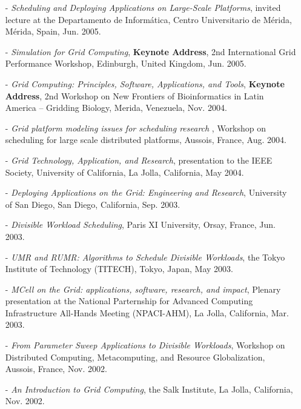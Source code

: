 \documentclass[times,11pt]{letter}
\begin{document}
\begin{itemize}
\item [-] {\it Scheduling and Deploying Applications on Large-Scale
Platforms}, invited lecture at the Departamento de Inform\'atica, Centro
Universitario de M\'erida, M\'erida, Spain, Jun. 2005.

\item [-] {\it Simulation for Grid Computing}, {\bf Keynote Address},
2nd International Grid Performance Workshop, Edinburgh, United Kingdom,
Jun. 2005.

\item [-] {\it Grid Computing: Principles, Software, Applications, and Tools},
{\bf Keynote Address}, 2nd Workshop on New Frontiers of Bioinformatics in Latin America -- Gridding
Biology, Merida, Venezuela, Nov. 2004.

\item [-] {\it Grid platform modeling issues for scheduling research },
Workshop on scheduling for large scale distributed platforms, Aussois,
France, Aug. 2004.

\item [-] {\it Grid Technology, Application, and Research}, presentation 
to the IEEE Society, University of California, La Jolla, California, May 2004.

\item [-] {\it Deploying Applications on the Grid: Engineering and
Research}, University of San Diego, San Diego, California, Sep. 2003.

\item [-] {\it Divisible Workload Scheduling}, Paris XI University,
Orsay, France, Jun. 2003.

\item [-] {\it UMR and RUMR: Algorithms to Schedule Divisible Workloads},
the Tokyo Institute of Technology (TITECH), Tokyo, Japan, 
May 2003.

\item[-] {\it MCell on the Grid: applications, software, research,
and impact}, Plenary presentation at the National Parternship for Advanced
Computing Infrastructure All-Hands Meeting (NPACI-AHM), La Jolla,
California, Mar. 2003.


\item[-] {\it From Parameter Sweep Applications to Divisible Workloads},
Workshop on Distributed Computing, Metacomputing, and Resource
Globalization, Aussois, France, Nov. 2002.

\item[-] {\it An Introduction to Grid Computing}, the Salk Institute,
La Jolla, California, Nov. 2002.


\end{itemize}
\end{document}

